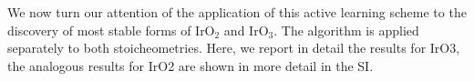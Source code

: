 %



%
We now turn our attention of the application of this active learning scheme to the discovery of most stable forms of IrO$_2$ and IrO$_3$.
%
The algorithm is applied separately to both stoicheometries.
%
Here, we report in detail the results for IrO3, the analogous results for IrO2 are shown in more detail in the SI.


